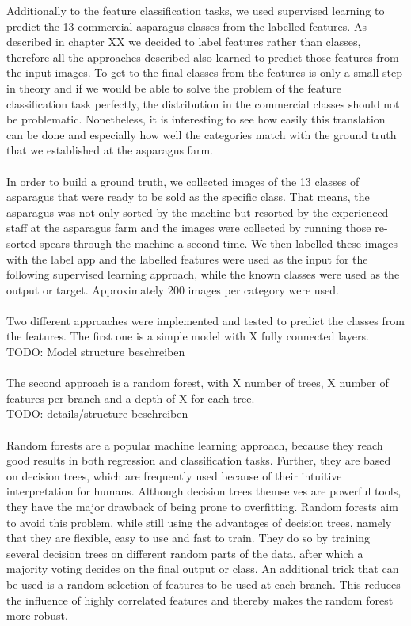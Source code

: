 Additionally to the feature classification tasks, we used supervised learning to predict the 13 commercial asparagus classes from the labelled features. As described in chapter XX we decided to label features rather than classes, therefore all the approaches described also learned to predict those features from the input images. To get to the final classes from the features is only a small step in theory and if we would be able to solve the problem of the feature classification task perfectly, the distribution in the commercial classes should not be problematic. Nonetheless, it is interesting to see how easily this translation can be done and especially how well the categories match with the ground truth that we established at the asparagus farm. \\
\\
In order to build a ground truth, we collected images of the 13 classes of asparagus that were ready to be sold as the specific class. That means, the asparagus was not only sorted by the machine but resorted by the experienced staff at the asparagus farm and the images were collected by running those re-sorted spears through the machine a second time. We then labelled these images with the label app and the labelled features were used as the input for the following supervised learning approach, while the known classes were used as the output or target. Approximately 200 images per category were used. \\
\\
Two different approaches were implemented and tested to predict the classes from the features. The first one is a simple model with X fully connected layers.\\
TODO: Model structure beschreiben\\
\\
The second approach is a random forest, with X number of trees, X number of features per branch and a depth of X for  each tree.\\
TODO: details/structure beschreiben\\
\\
Random forests are a popular machine learning approach, because they reach good results in both regression and classification tasks. Further, they are based on decision trees, which are frequently used because of their intuitive interpretation for humans. Although decision trees themselves are powerful tools, they have the major drawback of being prone to overfitting. Random forests aim to avoid this problem, while still using the advantages of decision trees, namely that they are flexible, easy to use and fast to train. They do so by training several decision trees on different random parts of the data, after which a majority voting decides on the final output or class. An additional trick that can be used is a random selection of features to be used at each branch. This reduces the influence of highly correlated features and thereby makes the random forest more robust.\\

